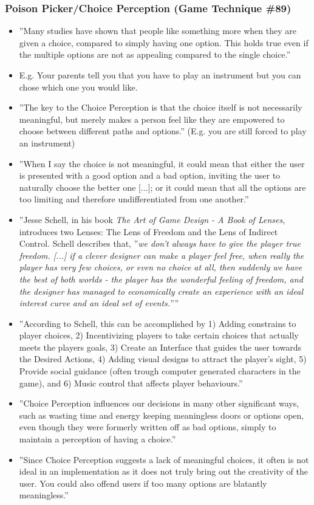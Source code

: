\subsubsection{Poison Picker/Choice Perception (Game Technique \#89)}
    \begin{itemize}
        \item ''Many studies have shown that people like something more when they are given a choice, compared to simply having one option. This holds true even if the multiple options are not as appealing compared to the single choice.''
        \item E.g. Your parents tell you that you have to play an instrument but you can chose which one you would like.
        \item ''The key to the Choice Perception is that the choice itself is not necessarily meaningful, but merely makes a person feel like they are empowered to choose between different paths and options.'' (E.g. you are still forced to play an instrument)
        \item ''When I say the choice is not meaningful, it could mean that either the user is presented with a good option and a bad option, inviting the user to naturally choose the better one [...]; or it could mean that all the options are too limiting and therefore undifferentiated from one another.''
        \item ''Jesse Schell, in his book \textit{The Art of Game Design - A Book of Lenses}, introduces two Lenses: The Lens of Freedom and the Lens of Indirect Control. Schell describes that, ''\textit{we don't always have to give the player true freedom. [...] if a clever designer can make a player feel free, when really the player has very few choices, or even no choice at all, then suddenly we have the best of both worlds - the player has the wonderful feeling of freedom, and the designer has managed to economically create an experience with an ideal interest curve and an ideal set of events.}''''
        \item ''According to Schell, this can be accomplished by 1) Adding constrains to player choices, 2) Incentivizing players to take certain choices that actually meets the players goals, 3) Create an Interface that guides the user towards the Desired Actions, 4) Adding visual designs to attract the player's sight, 5) Provide social guidance (often trough computer generated characters in the game), and 6) Music control that affects player behaviours.''
        \item ''Choice Perception influences our decisions in many other significant ways, such as wasting time and energy keeping meaningless doors or options open, even though they were formerly written off as bad options, simply to maintain a perception of having a choice.''
        \item ''Since Choice Perception suggests a lack of meaningful choices, it often is not ideal in an implementation as it does not truly bring out the creativity of the user. You could also offend users if too many options are blatantly meaningless.''
     \end{itemize}
     
